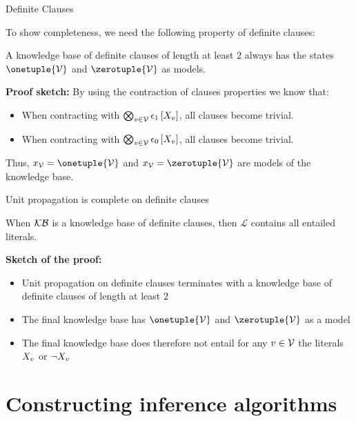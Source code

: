 \documentclass{beamer}
\begin{document}
    \begin{frame}{Definite Clauses}

        To show completeness, we need the following property of definite clauses:

        \begin{lemma}
            A knowledge base of definite clauses of length at least $2$ always has the states $\onetuple{\nodes}$ and $\zerotuple{\nodes}$ as models.
        \end{lemma}
            {\bf Proof sketch:} By using the contraction of clauses properties we know that:
        \begin{itemize}
            \item When contracting with $\bigotimes_{v\in\mathcal{V}}\epsilon_{1}\left[X_{v}\right]$, all clauses become trivial.
            \item When contracting with $\bigotimes_{v\in\mathcal{V}}\epsilon_{0}\left[X_{v}\right]$, all clauses become trivial.
        \end{itemize}
        Thus, $\catindexof{\nodes}=\onetuple{\nodes}$ and $\catindexof{\nodes}=\zerotuple{\nodes}$ are models of the knowledge base.


    \end{frame}


    \begin{frame}{Unit propagation is complete on definite clauses}
        \begin{theorem}
            When $\mathcal{KB}$ is a knowledge base of definite clauses, then $\mathcal{L}$ contains all entailed literals.
        \end{theorem}
        \medskip

        \textbf{Sketch of the proof:}
        \begin{itemize}
            \item Unit propagation on definite clauses terminates with a knowledge base of definite clauses of length at least $2$
            \item The final knowledge base has $\onetuple{\nodes}$ and $\zerotuple{\nodes}$ as a model
            \item The final knowledge base does therefore not entail for any $v\in\mathcal{V}$ the literals $X_{v}$ or $\lnot X_{v}$
        \end{itemize}
    \end{frame}


    \section{Constructing inference algorithms}
\end{document}

